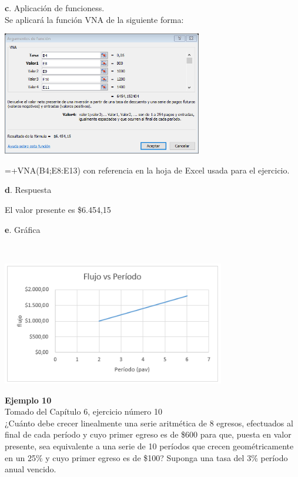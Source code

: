 \textbf{c}. Aplicación de funcioness.
 \\
 
Se aplicará la función VNA de la siguiente forma:     
 
 \begin{center}
	\includegraphics[height=5.4cm]{img/ch8/8_17.png}
\end{center}

=+VNA(B4;E8:E13) con referencia en la hoja de Excel usada para el ejercicio.

\vspace{2mm}

\textbf{d}. Respuesta

\vspace{2mm}

El valor presente es  \$6.454,15

\clearpage

\textbf{e}. Gráfica

\vspace{2mm}

\ \begin{center}
	\includegraphics[height=5.4cm]{img/ch8/8_18.png}
\end{center}

\textbf{Ejemplo 10}\\

Tomado del Capítulo 6, ejercicio número 10
\\

¿Cuánto debe crecer linealmente una serie aritmética de 8 egresos, efectuados al final de cada período y cuyo primer egreso es de \$600 para que, puesta en valor presente, sea equivalente a una serie de 10 períodos que crecen geométricamente en un 25\% y cuyo primer egreso es de \$100? Suponga una tasa del 3\% período anual vencido.

